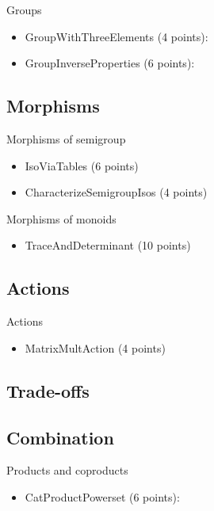 Groups
\begin{itemize}
    \item GroupWithThreeElements (4 points): 
    \item GroupInverseProperties (6 points): 
\end{itemize}

\subsection{Morphisms}
Morphisms of semigroup
\begin{itemize}
    \item IsoViaTables (6 points) 
    \item CharacterizeSemigroupIsos (4 points) 
\end{itemize}

Morphisms of monoids
\begin{itemize}
    \item TraceAndDeterminant (10 points) 
\end{itemize}

\subsection{Actions}

Actions
\begin{itemize}
    \item MatrixMultAction (4 points) 
\end{itemize}


\subsection{Trade-offs}





\subsection{Combination}

Products and coproducts
\begin{itemize}
    \item CatProductPowerset (6 points): 
\end{itemize}

